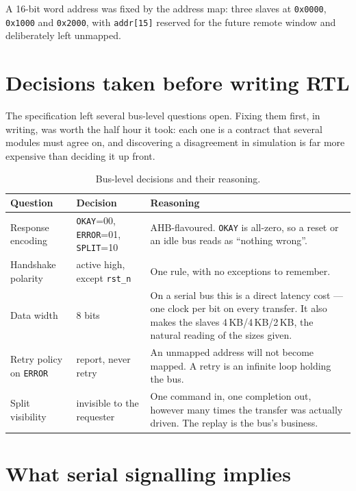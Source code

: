 \documentclass[11pt,a4paper]{article}
\newcommand{\sig}[1]{\texttt{#1}}
\begin{document}
A 16-bit word address was fixed by the address map: three slaves at
\sig{0x0000}, \sig{0x1000} and \sig{0x2000}, with \sig{addr[15]} reserved for
the future remote window and deliberately left unmapped.

\section{Decisions taken before writing RTL}

The specification left several bus-level questions open. Fixing them first,
in writing, was worth the half hour it took: each one is a contract that
several modules must agree on, and discovering a disagreement in simulation
is far more expensive than deciding it up front.

\begin{table}[htb]
\centering\small
\caption{Bus-level decisions and their reasoning.}
\begin{tabularx}{\textwidth}{@{}llX@{}}
\toprule
\textbf{Question} & \textbf{Decision} & \textbf{Reasoning}\\
\midrule
Response encoding & \sig{OKAY}=00, \sig{ERROR}=01, \sig{SPLIT}=10 &
AHB-flavoured. \sig{OKAY} is all-zero, so a reset or an idle bus reads as
``nothing wrong''.\\
\addlinespace
Handshake polarity & active high, except \sig{rst\_n} &
One rule, with no exceptions to remember.\\
\addlinespace
Data width & 8 bits &
On a serial bus this is a direct latency cost --- one clock per bit on every
transfer. It also makes the slaves 4\,KB/4\,KB/2\,KB, the natural reading of
the sizes given.\\
\addlinespace
Retry policy on \sig{ERROR} & report, never retry &
An unmapped address will not become mapped. A retry is an infinite loop
holding the bus.\\
\addlinespace
Split visibility & invisible to the requester &
One command in, one completion out, however many times the transfer was
actually driven. The replay is the bus's business.\\
\bottomrule
\end{tabularx}
\end{table}

\section{What serial signalling implies}
\end{document}

